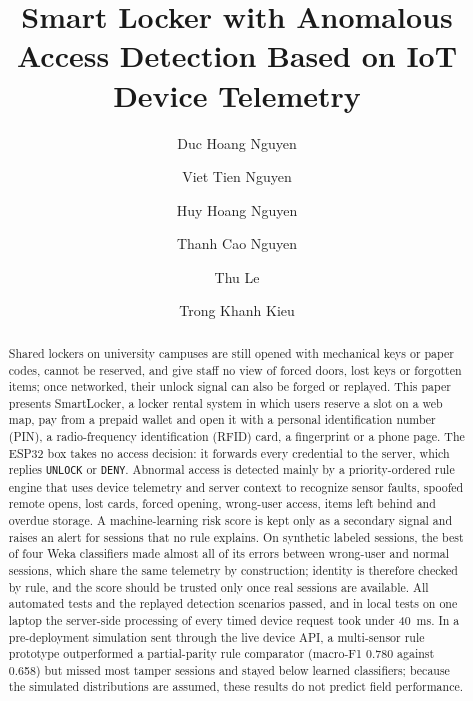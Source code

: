 \documentclass[sigconf,screen]{acmart}
\begin{document}
\title{Smart Locker with Anomalous Access Detection Based on IoT Device Telemetry}

\author{Duc Hoang Nguyen}

\author{Viet Tien Nguyen}

\author{Huy Hoang Nguyen}

\author{Thanh Cao Nguyen}

\author{Thu Le}

\author{Trong Khanh Kieu}

\renewcommand{\shortauthors}{D. H. Nguyen et al.}

\begin{abstract}
Shared lockers on university campuses are still opened with mechanical keys or paper codes, cannot be reserved,
and give staff no view of forced doors, lost keys or forgotten items; once networked, their unlock signal can also be
forged or replayed. This paper presents SmartLocker, a locker rental system in which users reserve a slot on a web map,
pay from a prepaid wallet and open it with a personal identification number (PIN), a radio-frequency identification
(RFID) card, a fingerprint or a phone page. The ESP32 box takes no access decision: it forwards every credential to the
server, which replies \texttt{UNLOCK} or \texttt{DENY}. Abnormal access is detected mainly by a priority-ordered rule
engine that uses device telemetry and server context to recognize sensor faults, spoofed remote opens, lost cards,
forced opening, wrong-user access, items left behind and overdue storage. A machine-learning risk score is kept only as
a secondary signal and raises an alert for sessions that no rule explains. On synthetic labeled sessions, the best of
four Weka classifiers made almost all of its errors between wrong-user and normal sessions, which share the same
telemetry by construction; identity is therefore checked by rule, and the score should be trusted only once real
sessions are available. All automated tests and the replayed detection scenarios passed, and in local tests on one laptop the server-side
processing of every timed device request took under 40~ms. In a pre-deployment simulation sent through the live device API, a multi-sensor rule prototype outperformed a
partial-parity rule comparator (macro-F1 0.780 against 0.658) but missed most tamper sessions and stayed below learned
classifiers; because the simulated distributions are assumed, these results do not predict field performance.
\end{abstract}
\end{document}
